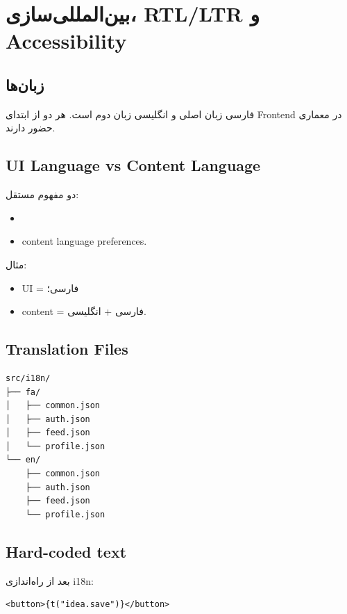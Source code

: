 
\chapter{بین‌المللی‌سازی، RTL/LTR و Accessibility}

\section{زبان‌ها}

\begin{decisionbox}
فارسی زبان اصلی و انگلیسی زبان دوم است. هر دو از ابتدای Frontend در معماری حضور دارند.
\end{decisionbox}

\section{UI Language vs Content Language}

دو مفهوم مستقل:
\begin{itemize}
  \item {}
  \item content language preferences.
\end{itemize}

مثال:
\begin{itemize}
  \item UI = فارسی؛
  \item content = فارسی + انگلیسی.
\end{itemize}

\section{Translation Files}

\begin{latin}
\begin{lstlisting}
src/i18n/
├── fa/
│   ├── common.json
│   ├── auth.json
│   ├── feed.json
│   └── profile.json
└── en/
    ├── common.json
    ├── auth.json
    ├── feed.json
    └── profile.json
\end{lstlisting}
\end{latin}

\section{Hard-coded text}

بعد از راه‌اندازی i18n:
\begin{latin}
\begin{lstlisting}
<button>{t("idea.save")}</button>
\end{lstlisting}
\end{latin}

